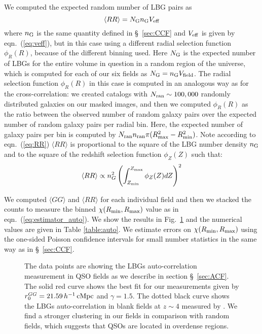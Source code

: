\documentclass[iop, revtex4]{emulateapj}
\begin{document}
We computed the expected random number of LBG pairs as \citep[see e.g.][]{Padmanabhan07}
\begin{equation}
\langle RR\rangle = N_{\rm G} n_{\rm G} V_{\rm eff}
\label{eq:RR}
\end{equation}
where $n_{\rm G}$ is the same quantity defined in \S~\ref{sec:CCF} and $V_{\rm eff}$ is given by eqn.~(\ref{eq:veff}),
 but in this case using a different radial selection function $\phi_{R}(R)$, because of the different
binning used.  Here $N_{\rm G}$ is the expected number of LBGs for the entire
volume in question in a random region of the universe, which is computed for each of our six fields as
$N_{\rm G} = n_{\rm G} V_{\rm field}$.
The radial selection function $\phi_{R}(R)$ in this case is computed in an analogous way as for the cross-correlation: we created catalogs with $N_{\rm ran}\sim 100,000$ randomly distributed galaxies on our masked images,
and then we computed $\phi_{R}(R)$ as the ratio between the observed number of random galaxy pairs over the expected number of random galaxy pairs per radial bin. Here, the expected number of galaxy pairs per bin is computed by $N_{\rm ran}n_{\rm ran}\pi (R^{2}_{\rm max}-R^{2}_{\rm min})$. Note according to
eqn.~(\ref{eq:RR}) $\langle RR\rangle$ is proportional to the square of the LBG number density $n_{\rm G}$ and to the square of the redshift selection function $\phi_{Z}(Z)$ such that:
\begin{equation}
\langle RR\rangle \propto n^{2}_{G} \left(\int_{Z_{\rm min}}^{Z_{\rm max}} \phi_{Z}(Z) dZ\right)^{2}
\label{eq:RR_final}
\end{equation}

We computed $\langle GG\rangle$ and $\langle RR\rangle$ for each individual field and then we stacked the counts to measure the binned $\chi (R_{\rm min}, R_{\rm max})$ value as in eqn.~(\ref{eq:estimator_auto}). We show the results in Fig.~\ref{fig:autocorr} and the numerical values are given in Table \ref{table:auto}. We estimate errors on  $\chi (R_{\rm min}, R_{\rm max})$ using 
the one-sided Poisson confidence intervals for small number statistics in the same way as in \S~\ref{sec:CCF}.

\begin{figure}[t!]
\begin{center}
\caption{\label{fig:autocorr} The data points are showing the LBGs auto-correlation measurement in QSO fields as we describe in section \S~\ref{sec:ACF}. The solid red curve shows the best fit for our measurements given by $r^{GG}_{0}=21.59 \,h^{-1}\,{\rm cMpc}$ and $\gamma=1.5$. The dotted black curve shows the LBGs auto-correlation in blank fields at $z\sim4$ measured by \citet{Ouchi04b}. We find a stronger clustering in our fields in comparison with random fields, which suggests that QSOs are located in overdense regions.\\}
\end{center}
\end{figure} 
\end{document}
